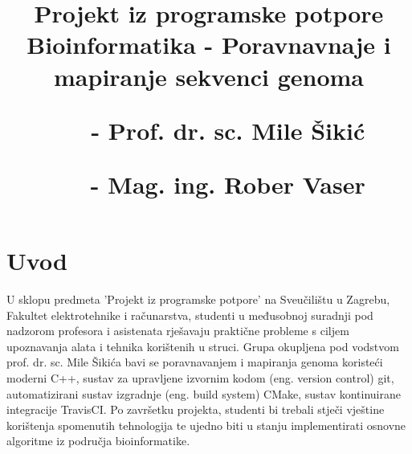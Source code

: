 \documentclass[times, 12pt, utf8]{article}
\begin{document}
\begin{titlepage}
    \clearpage
    \thispagestyle{empty}

    \title{
    {\large Projekt iz programske potpore} \\
    { \textbf{Bioinformatika - Poravnavnaje i mapiranje sekvenci genoma} }

    \vbox{}
    \vspace{0.5cm}

    \footnotesize{
        \begin{itemize}[leftmargin=3.5cm]
            \setlength{\itemindent}{0.8cm}

            Voditelji: 
                \item[-] Prof. dr. sc. Mile Šikić
                \item[-] Mag. ing. Rober Vaser
        \end{itemize}
        
        }
        
        \date{}
        }

    \clearpage
\end{titlepage}

\maketitle

\newpage
\clearpage
{}

\tableofcontents

\newpage
\clearpage
{}

\section{Uvod}
    U sklopu predmeta 'Projekt iz programske potpore' na Sveučilištu u Zagrebu,
    Fakultet elektrotehnike i računarstva, studenti u međusobnoj suradnji 
    pod nadzorom profesora i asistenata rješavaju praktične probleme
    s ciljem upoznavanja alata i tehnika korištenih u struci. Grupa 
    okupljena pod vodstvom prof. dr. sc. Mile Šikića bavi se 
    poravnavanjem i mapiranja genoma koristeći moderni C++,
    sustav za upravljene izvornim kodom (eng. version control) git,
    automatizirani sustav izgradnje (eng. build system) CMake,
    sustav kontinuirane integracije TravisCI.
    Po završetku projekta, studenti bi trebali stječi vještine 
    korištenja spomenutih tehnologija te ujedno biti u stanju 
    implementirati osnovne algoritme iz područja bioinformatike.
\end{document}
